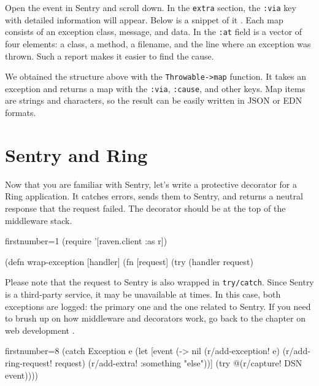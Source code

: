 Open the event in Sentry and scroll down. In the \verb|extra| section, the \verb|:via| key with detailed information will appear. Below is a snippet of it . Each map consists of an exception class, message, and data. In the \verb|:at| field is a vector of four elements: a class, a method, a filename, and the line where an exception was thrown. Such a report makes it easier to find the cause.


We obtained the structure above with the \texttt{Throw\-able->map} function. It takes an exception and returns a map with the \verb|:via|, \verb|:cause|, and other keys.
Map items are strings and characters, so the result can be easily written in JSON or EDN formats.

\section{Sentry and Ring}


Now that you are familiar with Sentry, let's write a protective decorator for a Ring application. It catches errors, sends them to Sentry, and returns a neutral response that the request failed. The decorator should be at the top of the middleware stack.

\begin{clojure/lines*}{firstnumber=1}
(require '[raven.client :as r])

(defn wrap-exception
  [handler]
  (fn [request]
    (try
      (handler request)
\end{clojure/lines*}

Please note that the request to Sentry is also wrapped in \verb|try/catch|. Since Sentry is a third-party service, it may be unavailable at times. In this case, both exceptions are logged: the primary one and the one related to Sentry.
If you need to brush up on how middleware and decorators work, go back to the chapter on web development .

\ifx\DEVICETYPE\MOBILE

\begin{clojure/lines*}{firstnumber=8}
(catch Exception e
  (let [event
        (-> nil
            (r/add-exception! e)
            (r/add-ring-request!
              request)
            (r/add-extra!
              {:something "else"}))]
    (try @(r/capture! DSN event))))
\end{clojure/lines*}

